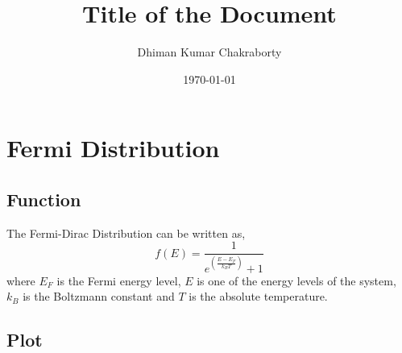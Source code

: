 \documentclass[12pt,a4paper]{article}
\title{Title of the Document}
\author{Dhiman Kumar Chakraborty}
\date{\today}
\begin{document}
\maketitle

\section{Fermi Distribution}
\subsection{Function}

The Fermi-Dirac Distribution can be written as,
$$
f(E) = \frac{1}{e^{\left(\frac{E - E_F}{k_B T}\right)} + 1}
$$
where $E_F$ is the Fermi energy level, $E$ is one of the energy levels of the system, $k_B$ is the Boltzmann constant and $T$ is the absolute temperature.

\subsection{Plot}
\end{document}
